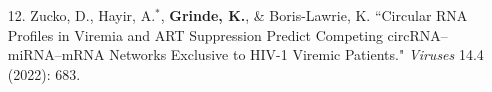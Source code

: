 \documentclass[margin]{res}
\begin{document}
\begin{resume}
\begin{itemize}
\item[12.] Zucko, D., Hayir, A.$^*$,  \textbf{Grinde, K.}, \& Boris-Lawrie, K. ``Circular RNA Profiles in Viremia and ART Suppression Predict Competing circRNA– miRNA–mRNA Networks Exclusive to HIV-1 Viremic Patients." \textit{Viruses} 14.4 (2022): 683. 


\end{itemize}
\end{resume}
\end{document}
